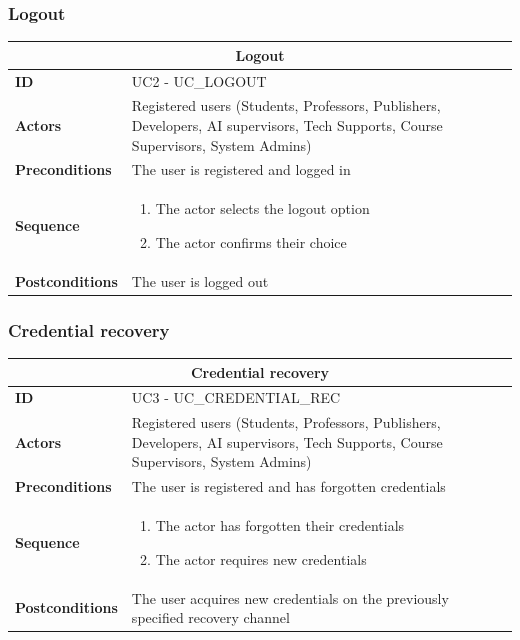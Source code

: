 \subsubsection{Logout}
\begin{tabular}{|m{2.5cm}|m{8cm}|}
	\hline
	\multicolumn{2}{|c|}{Logout} \\
	\hline
	\textbf{ID} & UC2 - UC\_LOGOUT \\
	\hline
	\textbf{Actors} & Registered users (Students, Professors, Publishers, Developers, AI supervisors, Tech Supports, Course Supervisors, System Admins) \\
	\hline
	\textbf{Preconditions} & The user is registered and logged in \\
	\hline
	\textbf{Sequence} & 
	\begin{enumerate}
		\item The actor selects the logout option
		\item The actor confirms their choice
	\end{enumerate} \\
	\hline
	\textbf{Postconditions} & The user is logged out \\
	\hline
\end{tabular}

\subsubsection{Credential recovery}
\begin{tabular}{|m{2.5cm}|m{8cm}|}
	\hline
	\multicolumn{2}{|c|}{Credential recovery} \\
	\hline
	\textbf{ID} & UC3 - UC\_CREDENTIAL\_REC \\
	\hline
	\textbf{Actors} & Registered users (Students, Professors, Publishers, Developers, AI supervisors, Tech Supports, Course Supervisors, System Admins) \\
	\hline
	\textbf{Preconditions} & The user is registered and has forgotten credentials \\
	\hline
	\textbf{Sequence} & 
	\begin{enumerate}
		\item The actor has forgotten their credentials
		\item The actor requires new credentials
	\end{enumerate} \\
	\hline
	\textbf{Postconditions} & The user acquires new credentials on the previously specified recovery channel \\
	\hline
\end{tabular}

